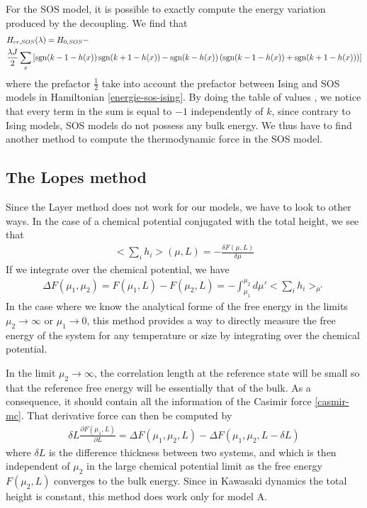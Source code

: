 For the SOS model, it is possible to exactly compute the energy variation produced by the decoupling. We find that
\begin{align}
&H_{cr,SOS}(\lambda) = H_{0,SOS} - \nonumber \\
&\frac{\lambda J}{2} \sum_x \left[ \operatorname{sgn}(k-1-h(x)) \operatorname{sgn}(k+1-h(x)) - \operatorname{sgn}(k-h(x)) \left( \operatorname{sgn}(k-1-h(x))+\operatorname{sgn}(k+1-h(x)) \right) \right]
\end{align}
where the prefactor $\frac{1}{2}$ take into account the prefactor between Ising and SOS models in Hamiltonian \eqref{energie-sos-ising}. By doing the table of values , we notice that every term in the sum is equal to $-1$ independently of $k$, since contrary to Ising models, SOS models do not possess any bulk energy. {\color{red}We thus have to find another method to compute the thermodynamic force in the SOS model.}

\subsection{The Lopes method}
    \label{sec-lopes}
Since the Layer method does not work for our models, we have to look to other ways. In the case of a chemical potential conjugated with the total height, we see that \cite{lopes_cardozo_critical_2014}
\begin{align}
<\sum_i h_i>(\mu,L) = - \frac{\delta F(\mu,L)}{\delta \mu}
\end{align} 
If we integrate over the chemical potential, we have
\begin{align}
\Delta F(\mu_1,\mu_2) = F(\mu_1,L) - F(\mu_2,L) = - \int_{\mu_1}^{\mu_2} d\mu' <\sum_i h_i>_{\mu'}
\label{integration-cardozo}
\end{align}
In the case where we know the analytical forme of the free energy in the limits $\mu_2 \to \infty$ or $\mu_1 \to 0$, this method provides a way to directly measure the free energy of the system for any temperature or size by integrating over the chemical potential.

In the limit $\mu_2 \to \infty$, the correlation length at the reference state will be small so that the reference free energy will be essentially that of the bulk. As a consequence, it should contain all the information of the Casimir force \eqref{casmir-mc}. That derivative force can then be computed by 
\begin{align}
    \delta L \frac{\partial F(\mu_1,L)}{\partial L} = \Delta F(\mu_1,\mu_2,L)-\Delta F(\mu_1,\mu_2,L-\delta L)
    \label{cas-lopes}
\end{align}
where $\delta L$ is the difference thickness between two systems, and which is then independent of $\mu_2$ in the large chemical potential limit as the free energy $F(\mu_2,L)$ converges to the bulk energy.
Since in Kawasaki dynamics the total height is constant, this method does work only for model A.

